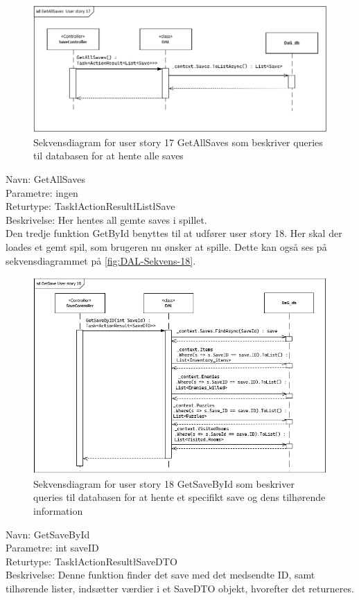 \begin{figure}[H]
\centering
\includegraphics[width = \textwidth]{02-Body/Images/DAL-Database/GetSavesSd.PNG}
\caption{Sekvensdiagram for user story 17 GetAllSaves som beskriver queries til databasen for at hente alle saves}
\label{fig:DAL-Sekvens-17}
\end{figure}

Navn: GetAllSaves\\
Parametre: ingen\\
Returtype: Task\l ActionResult\l List\l Save\g\g\g \\
Beskrivelse: Her hentes all gemte saves i spillet.\\

Den tredje funktion GetById benyttes til at udfører user story 18.
Her skal der loades et gemt spil, som brugeren nu ønsker at spille. 
Dette kan også ses på sekvensdiagrammet på \autoref{fig:DAL-Sekvens-18}.\\

\begin{figure}[H]
\centering
\includegraphics[width = \textwidth]{02-Body/Images/DAL-Database/GetSavesByIdSd.PNG}
\caption{Sekvensdiagram for user story 18 GetSaveById som beskriver queries til databasen for at hente et specifikt save og dens tilhørende information}
\label{fig:DAL-Sekvens-18}
\end{figure}

Navn: GetSaveById \\
Parametre: int saveID\\
Returtype: Task\l ActionResult\l SaveDTO\g\g\\
Beskrivelse: Denne funktion finder det save med det medsendte ID, samt tilhørende lister, indsætter værdier i et SaveDTO objekt, hvorefter det returneres.\\
